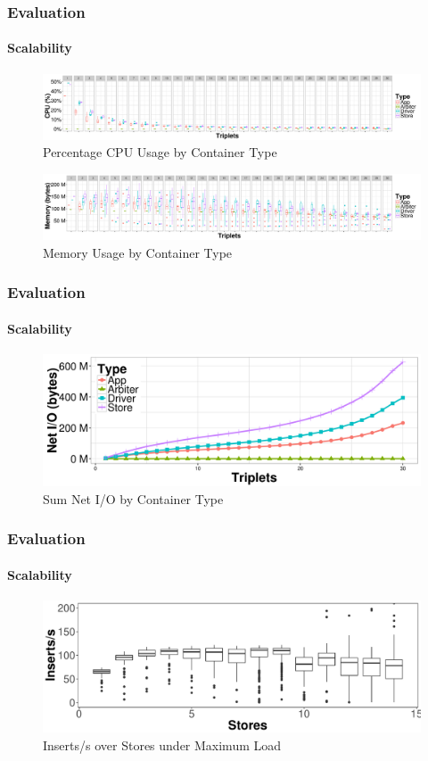 \documentclass[aspectratio=169]{beamer}
\begin{document}
\begin{frame}
	\frametitle{Evaluation}
	\framesubtitle{Scalability}

	\begin{figure}
		\centering
		\includegraphics[width=0.8\linewidth]{cpu-bins}
		\caption{Percentage CPU Usage by Container Type}
	\end{figure}

	\begin{figure}
		\centering
		\includegraphics[width=0.8\linewidth]{mem-bins}
		\caption{Memory Usage by Container Type}
	\end{figure}
\end{frame}

\begin{frame}
	\frametitle{Evaluation}
	\framesubtitle{Scalability}

	\begin{figure}
		\centering
		\includegraphics[width=\linewidth]{io-bins}
		\caption{Sum Net I/O by Container Type}
	\end{figure}
\end{frame}

\begin{frame}
	\frametitle{Evaluation}
	\framesubtitle{Scalability}

	\begin{figure}
		\centering
		\includegraphics[width=\linewidth]{stores-2GB-swap-0ms-delay}
		\caption{Inserts/s over Stores under Maximum Load}
	\end{figure}
\end{frame}
\end{document}
